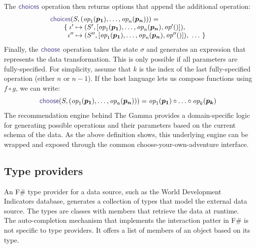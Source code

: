 \documentclass[nonacm,anonymous,sigplan,screen]{acmart}
\newcommand{\ident}[1]{\textsf{\color{DarkSlateBlue}{#1}}}
\newcommand{\select}{\textnormal{\ident{choose}}}
\newcommand{\choices}{\textnormal{\ident{choices}}}
\newcommand{\op}{\textit{op}}
\newcommand{\vect}[1]{\lbrack #1 \rbrack}
\begin{document}
The $\ident{choices}$ operation then returns options that append the additional operation:
\[
\begin{array}{l}
\choices(S, (\op_1(\boldsymbol{p_1}), \ldots, \op_n(\boldsymbol{p_n}))) =\\
\qquad \{\; \iota' \mapsto (S', \vect{\op_1(\boldsymbol{p_1}), \ldots, \op_n(\boldsymbol{p_n}), \op'()}), \\
\qquad \;\; \iota'' \mapsto (S'', \vect{\op_1(\boldsymbol{p_1}), \ldots, \op_n(\boldsymbol{p_n}), \op''()}), ~\ldots~\}
\end{array}
\]
Finally, the $\select$ operation takes the state $\sigma$ and generates an expression that represents
the data transformation. This is only possible if all parameters are fully-specified. For simplicity,
assume that $k$ is the index of the last fully-specified operation (either $n$ or $n\!-\!1$). If the
host language lets us compose functions using $f\circ g$, we can write:
\[
\select(S, (\op_1(\boldsymbol{p_1}), \ldots, \op_n(\boldsymbol{p_n}))) = \op_1(\boldsymbol{p_1}) \circ \ldots \circ \op_k(\boldsymbol{p_k})
\]
The recommendation engine behind The Gamma provides a domain-specific logic for generating
possible operations and their parameters based on the current schema of the data. As the above
definition shows, this underlying engine can be wrapped and exposed through the common
choose-your-own-adventure interface.


\subsection{Type providers}
\label{sec:examples-tps}

An F\# type provider for a data source, such as the World Development Indicators database,
generates a collection of types that model the external data source. The types are classes
with members that retrieve the data at runtime. The auto-completion
mechanism that implements the interaction patter in F\# is not specific to type providers.
It offers a list of members of an object based on its type.
\end{document}
